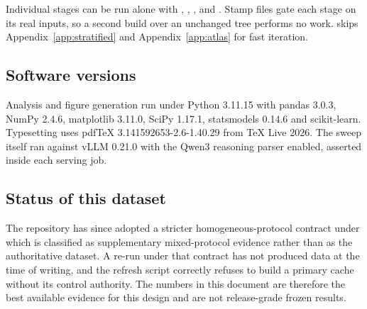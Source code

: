 Individual stages can be run alone with , ,
,  and . Stamp files gate each stage
on its real inputs, so a second build over an unchanged tree performs no work.
 skips Appendix~\ref{app:stratified} and Appendix~\ref{app:atlas} for fast
iteration.

\subsection{Software versions}

Analysis and figure generation run under Python 3.11.15 with pandas 3.0.3, NumPy 2.4.6,
matplotlib 3.11.0, SciPy 1.17.1, statsmodels 0.14.6 and scikit-learn. Typesetting uses
pdfTeX 3.141592653-2.6-1.40.29 from TeX Live 2026. The sweep itself ran against vLLM
0.21.0 with the Qwen3 reasoning parser enabled, asserted inside each serving job.

\subsection{Status of this dataset}

The repository has since adopted a stricter homogeneous-protocol contract under which
 is classified as supplementary mixed-protocol evidence rather than
as the authoritative dataset. A re-run under that contract has not produced data at the
time of writing, and the refresh script correctly refuses to build a primary cache without
its control authority. The numbers in this document are therefore the best available
evidence for this design and are not release-grade frozen results.
